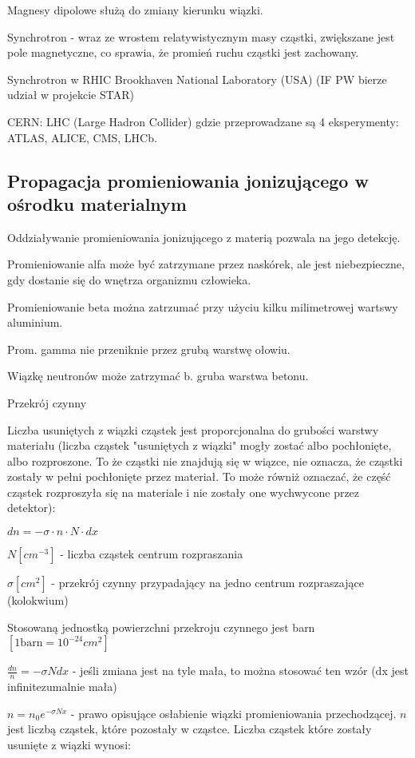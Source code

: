 \documentclass{article}
\begin{document}
Magnesy dipolowe służą do zmiany kierunku wiązki.

Synchrotron - wraz ze wrostem relatywistycznym masy cząstki, zwiększane jest pole magnetyczne, co sprawia, że promień ruchu cząstki jest zachowany.

Synchrotron w RHIC Brookhaven National Laboratory (USA) (IF PW bierze udział w projekcie STAR)

CERN: LHC (Large Hadron Collider) gdzie przeprowadzane są 4 eksperymenty: ATLAS, ALICE, CMS, LHCb.

\subsection{Propagacja promieniowania jonizującego w ośrodku materialnym}

Oddziaływanie promieniowania jonizującego z materią pozwala na jego detekcję.

Promieniowanie alfa może być zatrzymane przez naskórek, ale jest niebezpieczne, gdy dostanie się do wnętrza organizmu człowieka.

Promieniowanie beta można zatrzumać przy użyciu kilku milimetrowej wartswy aluminium.

Prom. gamma nie przeniknie przez grubą warstwę ołowiu.

Wiązkę neutronów może zatrzymać b. gruba warstwa betonu.

Przekrój czynny

Liczba usuniętych z wiązki cząstek jest proporcjonalna do grubości warstwy materiału (liczba cząstek "usuniętych z wiązki" mogły zostać albo pochłonięte, albo rozproszone. To że cząstki nie znajdują się w wiązce, nie oznacza, że cząstki zostały w pełni pochłonięte przez materiał. To może równiż oznaczać, że część cząstek rozproszyła się na materiale i nie zostały one wychwycone przez detektor):

$dn = -\sigma \cdot n \cdot N \cdot dx$

$N [cm^{-3}]$ - liczba cząstek centrum rozpraszania

$\sigma [cm^2]$ - przekrój czynny przypadający na jedno centrum rozpraszające (kolokwium)

Stosowaną jednostką powierzchni przekroju czynnego jest barn $[1\mathrm{barn}=10^{-24} cm^2]$

$\frac{dn}{n} = -\sigma N dx$ - jeśli zmiana jest na tyle mała, to można stosować ten wzór (dx jest infinitezumalnie mała)

$n = n_0e^{-\sigma N x}$ - prawo opisujące osłabienie wiązki promieniowania przechodzącej. $n$ jest liczbą cząstek, które pozostały w cząstce. Liczba cząstek które zostały usunięte z wiązki wynosi:
\end{document}
